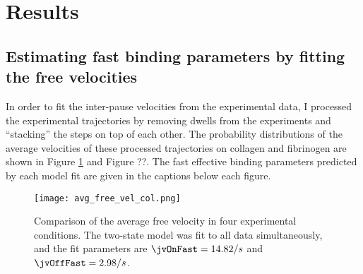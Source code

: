 
\section{Results}
\label{sec:results-jump-velocity}

\subsection{Estimating fast binding parameters by fitting the free
  velocities}
\label{sec:estim-fast-bind}

In order to fit the inter-pause velocities from the experimental data,
I processed the experimental trajectories by removing dwells from the
experiments and ``stacking'' the steps on top of each other. The
probability distributions of the average velocities of these processed
trajectories on collagen and fibrinogen are shown in Figure
\ref{fig:avg-free-vel-col} and Figure ??. The fast effective binding
parameters predicted by each model fit are given in the captions below
each figure.

\begin{figure}
  \centering
  \texttt{[image: avg\_free\_vel\_col.png]}
  \caption{Comparison of the average free velocity in four
    experimental conditions. The two-state model was fit to all data
    simultaneously, and the fit parameters are $\jvOnFast = 14.82 / s$
    and $\jvOffFast = 2.98 / s$.}
  \label{fig:avg-free-vel-col}
\end{figure}


